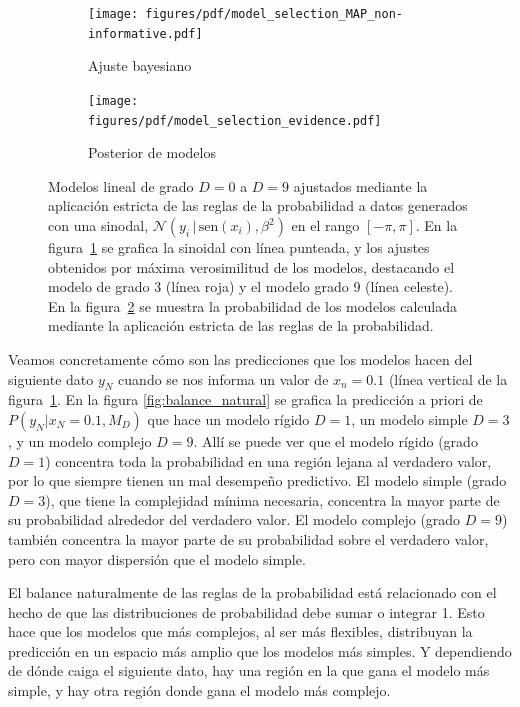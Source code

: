 \documentclass[a4paper,11pt]{book}
\newcommand{\N}{\mathcal{N}}
\theoremstyle{definition}
\begin{document}

\begin{figure}[ht!] \centering
  \begin{subfigure}[t]{0.32\textwidth}
  \centering
  \texttt{[image: figures/pdf/model\_selection\_MAP\_non-informative.pdf]}
  \caption{Ajuste bayesiano}
  \label{fig:model_selection_MAP_non-informative}
  \end{subfigure}
  \begin{subfigure}[t]{0.32\textwidth}
  \centering
  \texttt{[image: figures/pdf/model\_selection\_evidence.pdf]}
  \caption{Posterior de modelos}
  \label{fig:model_selection_evidence}
  \end{subfigure}
  \caption{Modelos lineal de grado $D=0$ a $D=9$ ajustados mediante la aplicación estricta de las reglas de la probabilidad a datos generados con una sinodal, $\N(y_i \,| \, \text{sen}(x_i), \beta^2)$ en el rango $[-\pi,\pi]$.
  En la figura~\ref{fig:model_selection_MAP_non-informative} se grafica la sinoidal con l\'inea punteada, y los ajustes obtenidos por máxima verosimilitud de los modelos, destacando el modelo de grado 3 (l\'inea roja) y el modelo grado 9 (l\'inea celeste).
  En la figura~\ref{fig:model_selection_evidence} se muestra la probabilidad de los modelos calculada mediante la aplicación estricta de las reglas de la probabilidad.}
  \label{fig:evaluacion_de_modelo}
\end{figure}


Veamos concretamente cómo son las predicciones que los modelos hacen del siguiente dato $y_N$ cuando se nos informa un valor de $x_n=0.1$ (l\'inea vertical de la figura~\ref{fig:model_selection_MAP_non-informative}.
%
En la figura \ref{fig:balance_natural} se grafica la predicci\'on a priori de $P(y_N|x_N=0.1, M_D)$ que hace un modelo r\'igido $D=1$, un modelo simple $D=3$, y un modelo complejo $D=9$.
%
All\'i se puede ver que el modelo r\'igido (grado $D=1$) concentra toda la probabilidad en una regi\'on lejana al verdadero valor, por lo que siempre tienen un mal desempe\~no predictivo.
%
El modelo simple (grado $D=3$), que tiene la complejidad m\'inima necesaria, concentra la mayor parte de su probabilidad alrededor del verdadero valor.
%
El modelo complejo (grado $D=9$) tambi\'en concentra la mayor parte de su probabilidad sobre el verdadero valor, pero con mayor dispersión que el modelo simple.


El balance naturalmente de las reglas de la probabilidad está relacionado con el hecho de que las distribuciones de probabilidad debe sumar o integrar 1.
%
Esto hace que los modelos que m\'as complejos, al ser m\'as flexibles, distribuyan la predicci\'on en un espacio m\'as amplio que los modelos m\'as simples.
%
Y dependiendo de d\'onde caiga el siguiente dato, hay una regi\'on en la que gana el modelo m\'as simple, y hay otra regi\'on donde gana el modelo m\'as complejo.
\end{document}
